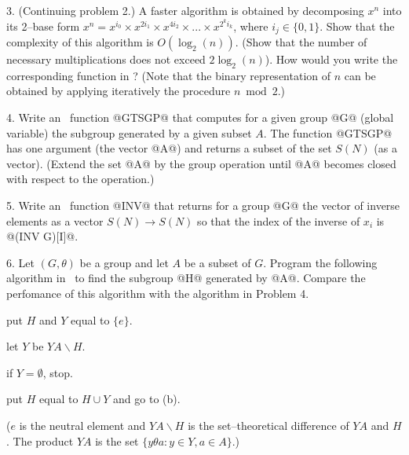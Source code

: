 \bigskip

\item{3.} (Continuing problem 2.) A faster algorithm is obtained by
          decomposing $x^n$ into its 2--base form
          $x^n = x^{i_0}\times x^{2i_1}\times
          x^{4i_2}\times ... \times x^{{2^k}i_k}$, where $i_j\in\{0,1\}$. Show
          that the complexity of this algorithm is $O(\log_2(n))$.
          (Show that the number of necessary multiplications does
          not exceed $2\log_2(n)$). How would you write the corresponding
          function in \APL? (Note that the binary representation of $n$
          can be obtained by applying iteratively the procedure $n\bmod 2$.)

\bigskip

\item{4.} Write an \APL\ function @GTSGP@ that computes for a given group @G@
          (global variable) the subgroup generated by a given subset $A$. The
          function @GTSGP@ has one argument (the vector @A@) and returns
          a subset of the set $S(N)$ (as a vector). (Extend the set @A@
          by the group operation until @A@ becomes closed with respect
          to the operation.)

\bigskip

\item{5.} Write an \APL\ function @INV@ that returns for a group @G@
          the vector of inverse elements as a vector $S(N)\to S(N)$ so
          that the index of the inverse of $x_i$ is @(INV G)[I]@.

\bigskip

\item{6.} Let $(G,\theta)$ be a group and let $A$ be a subset of $G$. Program
          the following algorithm in \APL\ to find the subgroup @H@
          generated by @A@. Compare the perfomance of this algorithm
          with the algorithm in Problem 4.
          \medskip

           put $H$ and $Y$ equal to $\{e\}$.

           let $Y$ be $YA\smallsetminus H$.

           if $Y=\emptyset$, stop.

           put $H$ equal to $H\cup Y$ and
                        go to (b).

          \medskip
\item{}     ($e$ is the neutral element and $YA\smallsetminus H$
           is the set--theoretical difference of $YA$ and $H$.
           The product $YA$ is the set $\{y\theta a: y\in Y, a\in A\}$.)

